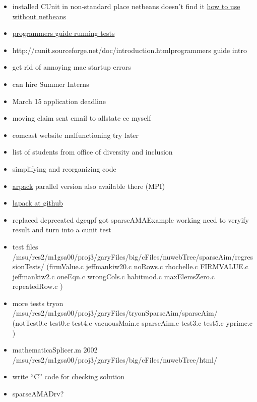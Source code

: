 \documentclass[hyperref]{labbook}
\begin{document}

\begin{itemize}
\item installed CUnit in non-standard place netbeans doesn't find it \href{https://ubuntuforums.org/archive/index.php/t-1727067.html}{how to use without netbeans}
\item \href{http://cunit.sourceforge.net/doc/running_tests.html}{programmers guide running tests}
\item{http://cunit.sourceforge.net/doc/introduction.html}{programmers guide intro}
\item get rid of annoying mac startup errors
\item can hire Summer Interns
\item March 15 application deadline
\item moving claim  sent email to allstate cc myself
\item comcast website malfunctioning try later
\item list of students from office of diversity and inclusion
\item simplifying and reorganizing code 
\item \href{http://www.caam.rice.edu/software/ARPACK/}{arpack}  parallel version also available there  (MPI)
\item \href{https://github.com/reference-lapack/lapack}{lapack at github}
\item replaced deprecated dgeqpf got sparseAMAExample working need to veryify result and turn into a cunit test
\end{itemize}



\begin{itemize}
\item test files /msu/res2/m1gsa00/proj3/garyFiles/big/cFiles/nuwebTree/sparseAim/regressionTests/  (firmValue.c  jeffmankiw20.c  noRows.c	    rhochelle.c
FIRMVALUE.c  jeffmankiw2.c   oneEqn.c	    wrongCols.c
habitmod.c   maxElemsZero.c  repeatedRow.c
)
\item more tests tryon /msu/res2/m1gsa00/proj3/garyFiles/tryonSparseAim/sparseAim/ (notTest0.c   test0.c  test4.c  vacuousMain.c
sparseAim.c  test3.c  test5.c  yprime.c
)
\item mathematicaSplicer.m 2002 /msu/res2/m1gsa00/proj3/garyFiles/big/cFiles/nuwebTree/html/
\item write ``C'' code for checking solution
\item sparseAMADrv?
\end{itemize}
\end{document}
